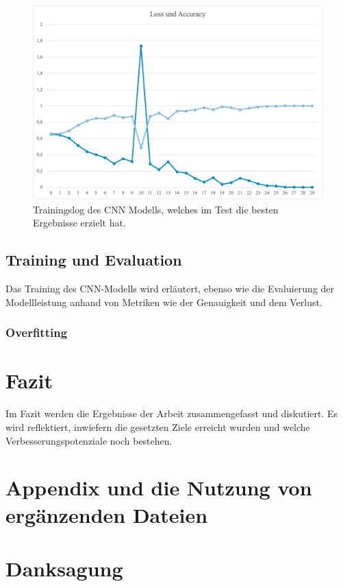\documentclass[journal,twoside,web]{ieeecolor}
\begin{document}
\begin{figure}[!t]
    \centerline{\includegraphics[width=\columnwidth]{Andi/Loss_Acc_Gewinner.png}}
    \caption{Trainingslog des CNN Modells, welches im Test die besten Ergebnisse erzielt hat.}
    \label{fig:winner}
\end{figure}

\subsection{Training und Evaluation}
Das Training des CNN-Modells wird erläutert, ebenso wie die Evaluierung der Modellleistung anhand von Metriken wie der Genauigkeit und dem Verlust.

\subsubsection{Overfitting} \label{sec:overfitting}

\section{Fazit}
Im Fazit werden die Ergebnisse der Arbeit zusammengefasst und diskutiert. Es wird reflektiert, inwiefern die gesetzten Ziele erreicht wurden und welche Verbesserungspotenziale noch bestehen.








\appendices

\section*{Appendix und die Nutzung von ergänzenden Dateien}

\section*{Danksagung}
\end{document}
